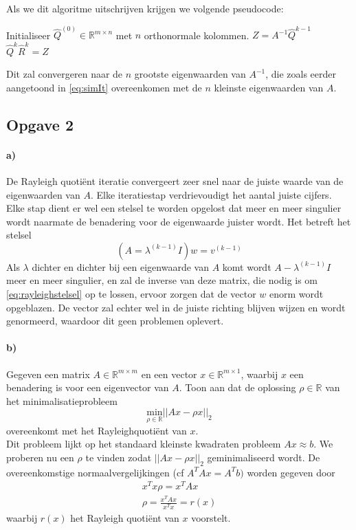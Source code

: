 \documentclass[a4paper, 12pt, titlepage]{report}
\begin{document}
Als we dit algoritme uitschrijven krijgen we volgende pseudocode:\\
\begin{algorithmic}
 \STATE Initialiseer $\hat{Q}^{(0)} \in \mathbb{R}^{m \times n}$ met $n$ orthonormale kolommen.
\STATE $Z = A^{-1}\hat{Q}^{k-1}$
\STATE $\hat{Q}^{k}\hat{R}^{k} = Z$
\ENDFOR
\end{algorithmic}
Dit zal convergeren naar de $n$ grootste eigenwaarden van $A^{-1}$, die zoals eerder aangetoond in \eqref{eq:simIt} overeenkomen met de $n$ kleinste eigenwaarden van $A$.

\subsection{Opgave 2}
\paragraph{a)} 
De Rayleigh quoti\"ent iteratie convergeert zeer snel naar de juiste waarde van de eigenwaarden van $A$. Elke iteratiestap verdrievoudigt het aantal juiste cijfers. Elke stap dient er wel een stelsel te worden opgelost dat meer en meer singulier wordt naarmate de benadering voor de eigenwaarde juister wordt. Het betreft het stelsel
\begin{equation}\label{eq:rayleighstelsel}
 (A=\lambda^{(k-1)}I)w = v^{(k-1)}
\end{equation}
Als $\lambda$ dichter en dichter bij een eigenwaarde van $A$ komt wordt $A-\lambda^{(k-1)}I$ meer en meer singulier, en zal de inverse van deze matrix, die nodig is om \eqref{eq:rayleighstelsel} op te lossen, ervoor zorgen dat de vector $w$ enorm wordt opgeblazen. De vector zal echter wel in de juiste richting blijven wijzen en wordt genormeerd, waardoor dit geen problemen oplevert.\\
\paragraph{b)}
Gegeven een matrix $A \in \mathbb{R}^{m \times m}$ en een vector $x \in \mathbb{R}^{m \times 1}$, waarbij $x$ een benadering is voor een eigenvector van $A$. Toon aan dat de oplossing $\rho \in \mathbb{R}$ van het minimalisatieprobleem 
\begin{equation}
 \underset{\rho \in \mathbb{R}}{\text{min}}|| Ax-\rho x||_{2}
\end{equation}
overeenkomt met het Rayleighquoti\"ent van $x$.\\
Dit probleem lijkt op het standaard kleinste kwadraten probleem $Ax \approx b$. We proberen nu een $\rho$ te vinden zodat $||Ax-\rho x||_{2}$ geminimaliseerd wordt. De overeenkomstige normaalvergelijkingen (cf $A^TAx = A^Tb)$ worden gegeven door 
\begin{subequations}
\begin{align}
  x^Tx\rho = x^TAx\\
 \rho = \frac{x^TAx}{x^Tx}=r(x)
\end{align}
\end{subequations}
waarbij $r(x)$ het Rayleigh quoti\"ent van $x$ voorstelt.
\end{document}
